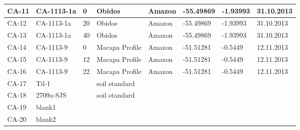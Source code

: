 \begin{table}[h]
\begin{tabular}{|l|l|l|l|l|l|l|l|}
CA-11   & CA-1113-1a           & 0     & Obidos                 & Amazon  & -55.49869    & -1.93993     & 31.10.2013    \\ \hline
CA-12   & CA-1113-1a           & 20    & Obidos                 & Amazon  & -55.49869    & -1.93993     & 31.10.2013    \\ \hline
CA-13   & CA-1113-1a           & 40    & Obidos                 & Amazon  & -55.49869    & -1.93993     & 31.10.2013    \\ \hline
CA-14   & CA-1113-9            & 0     & Macapa Profile         & Amazon  & -51.51281    & -0.5449      & 12.11.2013    \\ \hline
CA-15   & CA-1113-9            & 12    & Macapa Profile         & Amazon  & -51.51281    & -0.5449      & 12.11.2013    \\ \hline
CA-16   & CA-1113-9            & 22    & Macapa Profile         & Amazon  & -51.51281    & -0.5449      & 12.11.2013    \\ \hline
CA-17   & Til-1                &       & soil standard          &         &              &              &               \\ \hline
CA-18   & 2709a-SJS            &       & soil standard          &         &              &              &               \\ \hline
CA-19   & blank1               &       &                        &         &              &              &               \\ \hline
CA-20   & blank2               &       &                        &         &              &              &               \\ \hline
\end{tabular}
\end{table}

